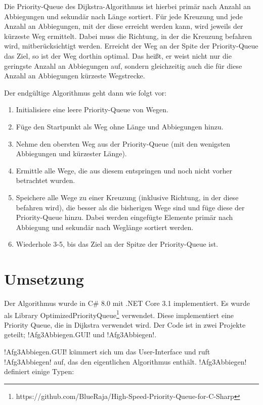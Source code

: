 \documentclass{article}
\begin{document}
Die Priority-Queue des Dijkstra-Algorithmus ist hierbei primär nach Anzahl an Abbiegungen und sekundär nach Länge sortiert.
Für jede Kreuzung und jede Anzahl an Abbiegungen, mit der diese erreicht werden kann, wird jeweils der kürzeste Weg ermittelt. Dabei muss die Richtung, in der die Kreuzung befahren wird, mitberücksichtigt werden.
Erreicht der Weg an der Spite der Priority-Queue das Ziel, so ist der Weg dorthin optimal. Das heißt, er weist nicht nur die geringste Anzahl an Abbiegungen auf, sondern gleichzeitig auch die für diese Anzahl an Abbiegungen kürzeste Wegstrecke.

Der endgültige Algorithmus geht dann wie folgt vor:

\begin{enumerate}
    \item Initialisiere eine leere Priority-Queue von Wegen.
    \item Füge den Startpunkt als Weg ohne Länge und Abbiegungen hinzu.
    \item Nehme den obersten Weg aus der Priority-Queue (mit den wenigsten Abbiegungen und kürzester Länge).
    \item Ermittle alle Wege, die aus diesem entspringen und noch nicht vorher betrachtet wurden.
    \item Speichere alle Wege zu einer Kreuzung (inklusive Richtung, in der diese befahren wird), die besser als die bisherigen Wege sind und füge diese der Priority-Queue hinzu. Dabei werden eingefügte Elemente primär nach Abbiegung und sekundär nach Weglänge sortiert werden.
    \item Wiederhole 3-5, bis das Ziel an der Spitze der Priority-Queue ist.
\end{enumerate}

\section{Umsetzung}

Der Algorithmus wurde in C\# 8.0 mit .NET Core 3.1 implementiert.
Es wurde als Library OptimizedPriorityQueue\footnote{https://github.com/BlueRaja/High-Speed-Priority-Queue-for-C-Sharp} verwendet. Diese implementiert eine Priority Queue, die in Dijkstra verwendet wird.
Der Code ist in zwei Projekte geteilt;
!Afg3Abbiegen.GUI! und !Afg3Abbiegen!.

!Afg3Abbiegen.GUI! kümmert sich um das User-Interface und ruft !Afg3Abbiegen! auf, das den eigentlichen Algorithmus enthält.
!Afg3Abbiegen! definiert einige Typen:
\end{document}
